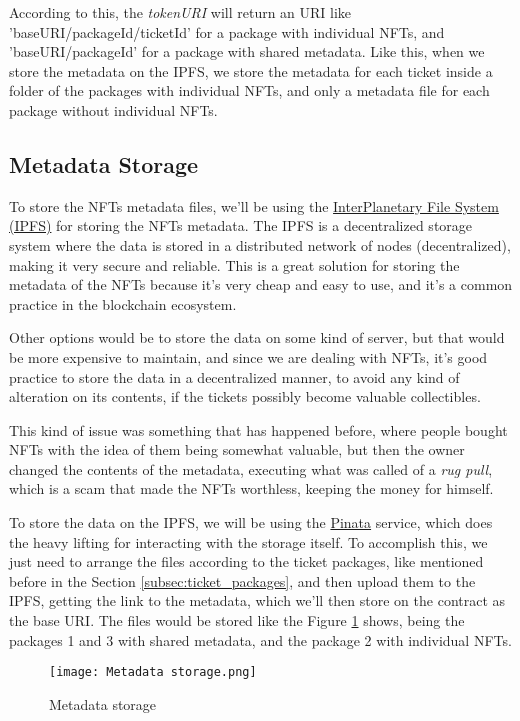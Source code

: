 According to this, the \textit{tokenURI} will return an URI like
'baseURI/packageId/ticketId' for a package with individual NFTs, and
'baseURI/packageId' for a package with shared metadata. Like this, when we
store the metadata on the IPFS, we store the metadata for each ticket inside a
folder of the packages with individual NFTs, and only a metadata file for each
package without individual NFTs.

\subsection{Metadata Storage}
\label{subsec:metadata_storage}

To store the NFTs metadata files, we'll be using the
\href{https://ipfs.tech/}{InterPlanetary File System (IPFS)} for storing the
NFTs metadata. The IPFS is a decentralized storage system where the data is
stored in a distributed network of nodes (decentralized), making it very secure
and reliable. This is a great solution for storing the metadata of the NFTs
because it's very cheap and easy to use, and it's a common practice in the
blockchain ecosystem.

Other options would be to store the data on some kind of server, but that would
be more expensive to maintain, and since we are dealing with NFTs, it's good
practice to store the data in a decentralized manner, to avoid any kind of
alteration on its contents, if the tickets possibly become valuable
collectibles.

This kind of issue was something that has happened before, where people bought
NFTs with the idea of them being somewhat valuable, but then the owner changed
the contents of the metadata, executing what was called of a \textit{rug pull},
which is a scam that made the NFTs worthless, keeping the money for himself.

To store the data on the IPFS, we will be using the
\href{https://www.pinata.cloud/}{Pinata} service, which does the heavy lifting
for interacting with the storage itself. To accomplish this, we just need to
arrange the files according to the ticket packages, like mentioned before in
the Section \ref{subsec:ticket_packages}, and then upload them to the IPFS,
getting the link to the metadata, which we'll then store on the contract as the
base URI. The files would be stored like the Figure \ref{fig:metadata_storage}
shows, being the packages 1 and 3 with shared metadata, and the package 2 with
individual NFTs.

\begin{figure}[H]
	\texttt{[image: Metadata storage.png]}
	\centering
	\caption{Metadata storage}
	\label{fig:metadata_storage}
\end{figure}

